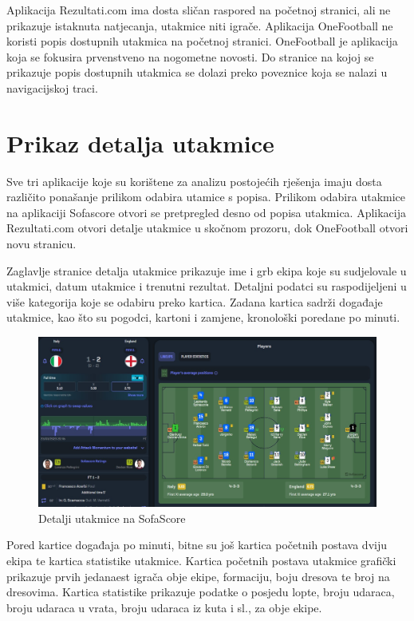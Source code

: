 \documentclass[times, utf8, zavrsni]{fer}
\begin{document}
Aplikacija Rezultati.com ima dosta sličan raspored na početnoj stranici, ali ne prikazuje istaknuta natjecanja, utakmice niti igrače.
Aplikacija OneFootball ne koristi popis dostupnih utakmica na početnoj stranici. OneFootball je aplikacija koja se fokusira prvenstveno na nogometne novosti.
Do stranice na kojoj se prikazuje popis dostupnih utakmica se dolazi preko poveznice koja se nalazi u navigacijskoj traci.

\section{Prikaz detalja utakmice}

Sve tri aplikacije koje su korištene za analizu postojećih rješenja imaju dosta različito ponašanje prilikom odabira utamice s popisa.
Prilikom odabira utakmice na aplikaciji Sofascore otvori se pretpregled desno od popisa utakmica.
Aplikacija Rezultati.com otvori detalje utakmice u skočnom prozoru, dok OneFootball otvori novu stranicu.

Zaglavlje stranice detalja utakmice prikazuje ime i grb ekipa koje su sudjelovale u utakmici, datum utakmice i trenutni rezultat.
Detaljni podatci su raspodijeljeni u više kategorija koje se odabiru preko kartica. Zadana kartica sadrži događaje utakmice, kao što su pogodci, kartoni i zamjene, kronološki poredane po minuti.

\begin{figure}[htb]
\centering
\includegraphics[width=15cm]{images/ss-detail.jpg}
\caption{Detalji utakmice na SofaScore}
\label{fig:ss-detail}
\end{figure}

Pored kartice događaja po minuti, bitne su još kartica početnih postava dviju ekipa te kartica statistike utakmice.
Kartica početnih postava utakmice grafički prikazuje prvih jedanaest igrača obje ekipe, formaciju, boju dresova te broj na dresovima.
Kartica statistike prikazuje podatke o posjedu lopte, broju udaraca, broju udaraca u vrata, broju udaraca iz kuta i sl., za obje ekipe.
\end{document}

